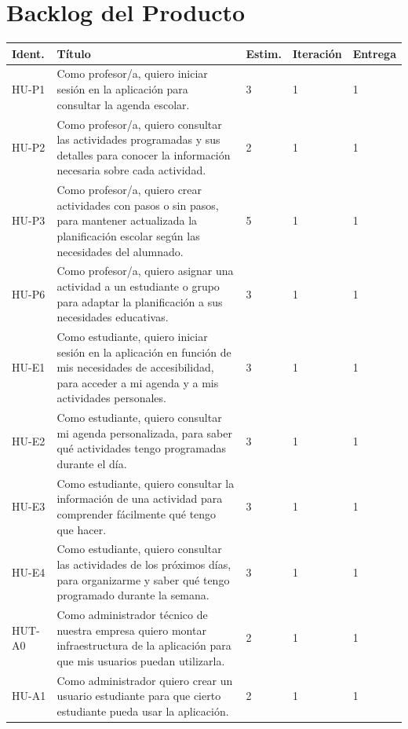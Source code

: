 
\section{Backlog del Producto}

\begin{xltabular}{\textwidth}{|p{2.2cm}|X|p{1.4cm}|p{1.7cm}|p{1.5cm}|}
\hline
{}
\textbf{Ident.} & \textbf{Título} & \textbf{Estim.} & \textbf{Iteración} & \textbf{Entrega} \\ \hline
\endhead

\hline
\endfoot

HU-P1 & Como profesor/a, quiero iniciar sesión en la aplicación para consultar la agenda escolar. & 3 & 1 & 1 \\ \hline
HU-P2 & Como profesor/a, quiero consultar las actividades programadas y sus detalles para conocer la información necesaria sobre cada actividad. & 2 & 1 & 1 \\ \hline
HU-P3 & Como profesor/a, quiero crear actividades con pasos o sin pasos, para mantener actualizada la planificación escolar según las necesidades del alumnado. & 5 & 1 & 1 \\ \hline
HU-P6 & Como profesor/a, quiero asignar una actividad a un estudiante o grupo para adaptar la planificación a sus necesidades educativas. & 3 & 1 & 1 \\ \hline
HU-E1 & Como estudiante, quiero iniciar sesión en la aplicación en función de mis necesidades de accesibilidad, para acceder a mi agenda y a mis actividades personales. & 3 & 1 & 1 \\ \hline
HU-E2 & Como estudiante, quiero consultar mi agenda personalizada, para saber qué actividades tengo programadas durante el día. & 3 & 1 & 1 \\ \hline
HU-E3 & Como estudiante, quiero consultar la información de una actividad para comprender fácilmente qué tengo que hacer. & 3 & 1 & 1 \\ \hline
HU-E4 & Como estudiante, quiero consultar las actividades de los próximos días, para organizarme y saber qué tengo programado durante la semana. & 3 & 1 & 1 \\ \hline
HUT-A0 & Como administrador técnico de nuestra empresa quiero montar infraestructura de la aplicación para que mis usuarios puedan utilizarla. & 2 & 1 & 1 \\ \hline
HU-A1 & Como administrador quiero crear un usuario estudiante para que cierto estudiante pueda usar la aplicación. & 2 & 1 & 1 \\ \hline

\end{xltabular}
